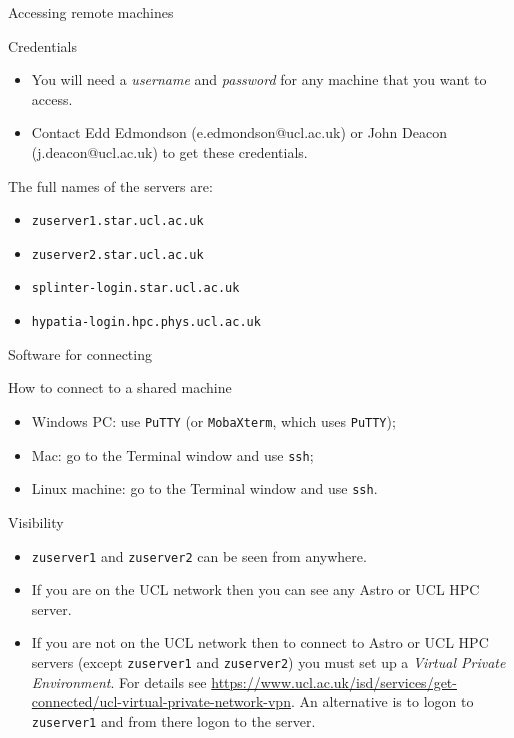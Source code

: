 \documentclass{beamer}
\newcommand{\command}[1]{\colorbox{light-gray}{\texttt{#1}}}
\begin{document}
\begin{frame}{Accessing remote machines}
  \begin{block}{Credentials}
    \begin{itemize}
      \item You will need a \textit{username} and \textit{password} for any machine that you want to access.
      \item Contact Edd Edmondson (e.edmondson@ucl.ac.uk) or John Deacon (j.deacon@ucl.ac.uk) to get these credentials.
    \end{itemize}
  \end{block}
  \begin{block}{The full names of the servers are:}
    \begin{itemize}
      \item \texttt{zuserver1.star.ucl.ac.uk}
      \item \texttt{zuserver2.star.ucl.ac.uk}
      \item \texttt{splinter-login.star.ucl.ac.uk}
      \item \texttt{hypatia-login.hpc.phys.ucl.ac.uk}
    \end{itemize}
  \end{block}
\end{frame}


\begin{frame}{Software for connecting}
  \begin{block}{How to connect to a shared machine}
    \begin{itemize}
      \item Windows PC: use \command{PuTTY} (or \command{MobaXterm}, which uses \command{PuTTY});
      \item Mac: go to the Terminal window and use \command{ssh};
      \item Linux machine: go to the Terminal window and use \command{ssh}.
    \end{itemize}
  \end{block}
\end{frame}

\begin{frame}{Visibility}
  \begin{block}{}
    \begin{itemize}
    \item \texttt{zuserver1} and \texttt{zuserver2} can be seen from anywhere.
    \item If you are on the UCL network then you can see any Astro or UCL HPC server.
    \item If you are not on the UCL network then to connect to Astro or UCL HPC servers (except \texttt{zuserver1} and \texttt{zuserver2}) you must set up a \textit{Virtual Private Environment}. For details see \url{https://www.ucl.ac.uk/isd/services/get-connected/ucl-virtual-private-network-vpn}. An alternative is to logon to \texttt{zuserver1} and from there logon to the server.
    \end{itemize}
  \end{block}
\end{frame}
\end{document}
